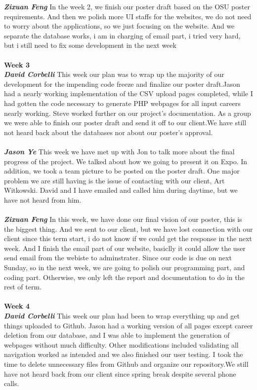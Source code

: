 \documentclass[onecolumn, draftclsnofoot,10pt, compsoc]{IEEEtran}
\begin{document}
\textbf{\textit{Zixuan Feng}}
In the week 2, we finish our poster draft based on the OSU poster requirements. And then we polish more UI staffs for the websites, we do not need to worry about the applications, so we just focusing on the website. And we separate the database works, i am in charging of email part, i tried very hard, but i still need to fix some development in the next week\\ \\
\textbf{Week 3}
\\ \textbf{\textit{David Corbelli}}
This week our plan was to wrap up the majority of our development for the impending code freeze and finalize our poster draft.Jason had a nearly working implementation of the CSV upload pages completed, while I had gotten the code necessary to generate PHP webpages for all input careers nearly working. Steve worked further on our project's documentation. As a group we were able to finish our poster draft and send it off to our client.We have still not heard back about the databases nor about our poster's approval.\\ \\
\textbf{\textit{Jason Ye}}
This week we have met up with Jon to talk more about the final progress of the project. We talked about how we going to present it on Expo. In addition, we took a team picture to be posted on the poster draft. One major problem we are still having is the issue of contacting with our client, Art Witkowski. David and I have emailed and called him during daytime, but we have not heard from him.\\ \\
\textbf{\textit{Zixuan Feng}}
In this week, we have done our final vision of our poster, this is the biggest thing. And we sent to our client, but we have lost connection with our client since this term start, i do not know if we could get the response in the next week. And I finish the email part of our website, basiclly it could allow the user send email from the webiste to adminstrater. Since our code is due on next Sunday, so in the next week, we are going to polish our programming part, and coding part. Otherwise, we only left the report and documentation to do in the rest of term.\\ \\
\textbf{Week 4}
\\ \textbf{\textit{David Corbelli}}
This week our plan had been to wrap everything up and get things uploaded to Github. Jason had a working version of all pages except career deletion from our database, and I was able to implement the generation of webpages without much difficulty. Other modifications included validating all navigation worked as intended and we also finished our user testing. I took the time to delete unnecessary files from Github and organize our repository.We still have not heard back from our client since spring break despite several phone calls.\\ \\
\end{document}
